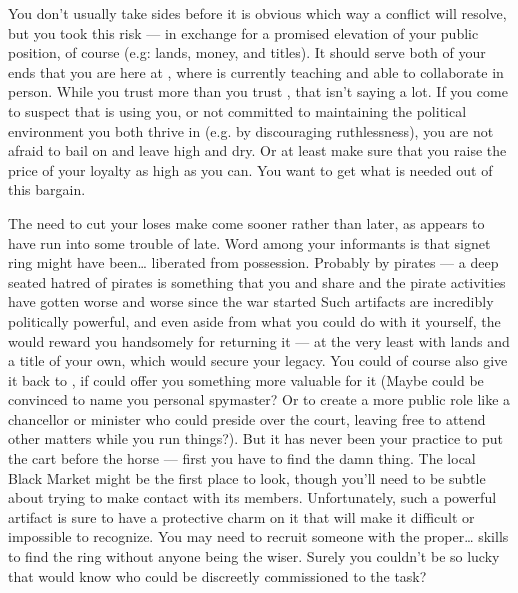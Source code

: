 \documentclass[char]{GL2020}
\begin{document}
You don't usually take sides before it is obvious which way a conflict will resolve, but you took this risk — in exchange for a promised elevation of your public position, of course (e.g: lands, money, and titles). It should serve both of your ends that you are here at \pSchool{}, where \cPrince{} is currently teaching and able to collaborate in person. While you trust \cPrince{} more than you trust \cDiplomat{}, that isn’t saying a lot. If you come to suspect that \cPrince{} is using you, or not committed to maintaining the political environment you both thrive in (e.g. by discouraging ruthlessness), you are not afraid to bail on \cPrince{\them} and leave \cPrince{\them} high and dry. Or at least make sure that you raise the price of your loyalty as high as you can. You want to get what is needed out of this bargain.

The need to cut your loses make come sooner rather than later, as \cPrince{} appears to have run into some trouble of late. Word among your informants is that \cPrince{\their} signet ring might have been\ldots{} liberated from \cPrince{\their} possession. Probably by pirates — a deep seated hatred of pirates is something that you and \cPrince{} share and the pirate activities have gotten worse and worse since the war started Such artifacts are incredibly politically powerful, and even aside from what you could do with it yourself, the \cQueen{\Monarch} would reward you handsomely for returning it — at the very least with lands and a title of your own, which would secure your legacy. You could of course also give it back to \cPrince{}, if \cPrince{\they} could offer you something more valuable for it (Maybe \cPrince{\they} could be convinced to name you \cPrince{\their} personal spymaster? Or to create a more public role like a chancellor or minister who could preside over the court, leaving \cPrince{} free to attend other matters while you run things?). But it has never been your practice to put the cart before the horse — first you have to find the damn thing. The local Black Market might be the first place to look, though you'll need to be subtle about trying to make contact with its members. Unfortunately, such a powerful artifact is sure to have a protective charm on it that will make it difficult or impossible to recognize. You may need to recruit someone with the proper\ldots{} skills to find the ring without anyone being the wiser. Surely you couldn’t be so lucky that \cLibAssist{} would know who could be discreetly commissioned to the task?
\end{document}
